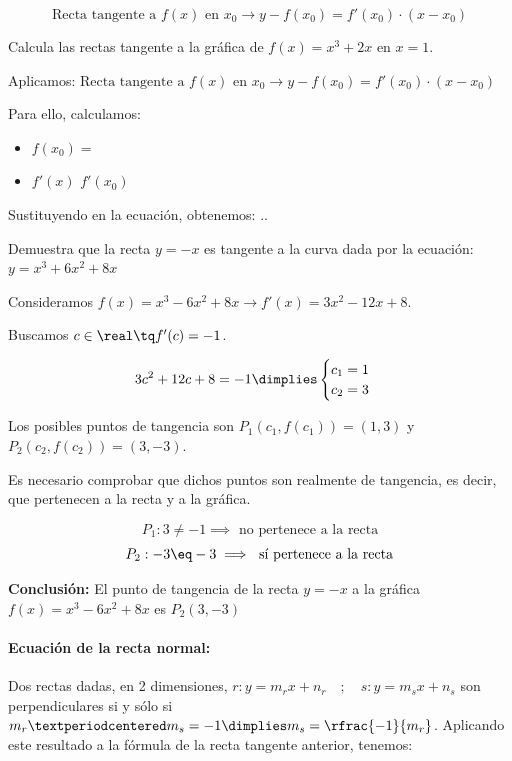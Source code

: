 \begin{mdframed}
	\begin{equation}
		\label{eq::rectatangente}
		\text{Recta tangente a }f(x)\text{ en }x_0 \to y-f(x_0) = f'(x_0)·(x-x_0)
	\end{equation}
\end{mdframed}

\begin{problem}
Calcula las rectas tangente a la gráfica de $f(x) = x^3+2x$ en $x=1$.
\solution

Aplicamos: $\text{Recta tangente a }f(x)\text{ en }x_0 \to y-f(x_0) = f'(x_0)·(x-x_0)$

Para ello, calculamos:
\begin{itemize}
	\item $f(x_0)=$
	\item $f'(x)$
	\subitem $f'(x_0)$
\end{itemize}
Sustituyendo en la ecuación, obtenemos:
.\vspace{2cm}.
\end{problem}

\begin{problem}
Demuestra que la recta $y=-x$ es tangente a la curva dada por la ecuación: $y=x^3+6x^2+8x$
\solution

Consideramos $f(x) = x^3-6x^2+8x \to f'(x) = 3x^2-12x+8$.

Buscamos $c\in\real\tq f'(c) = -1$.

\[
	3c^2+12c+8=-1 \dimplies \begin{cases}c_1 = 1\\c_2=3\end{cases}
\]

Los posibles puntos de tangencia son $P_1(c_1,f(c_1)) = (1,3)$ y $P_2(c_2,f(c_2)) = (3,-3)$.

Es necesario comprobar que dichos puntos son realmente de tangencia, es decir, que pertenecen a la recta y a la gráfica.

\[P_1: 3\neq -1 \implies \text{ no pertenece a la recta}\]
\[P_2: -3\eq -3 \implies \text{ sí pertenece a la recta}\]

\textbf{Conclusión: } El punto de tangencia de la recta $y=-x$ a la gráfica $f(x) = x^3-6x^2+8x$ es $P_2(3,-3)$
\end{problem}

\paragraph{Ecuación de la recta normal:} Dos rectas dadas, en 2 dimensiones, $r: y=m_rx+n_r\quad;\quad s:y=m_sx+n_s$ son perpendiculares si y sólo si $m_r·m_s = -1 \dimplies m_s = \rfrac{-1}{m_r}$.
%
Aplicando este resultado a la fórmula de la recta tangente anterior, tenemos:


